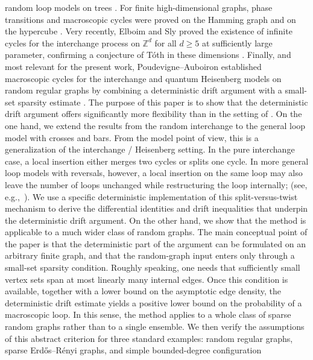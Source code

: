 \documentclass[11pt]{article}
\theoremstyle{remark}
\theoremstyle{plain}
\newcommand{\1}{\mathbbm{1}}
\begin{document}
random loop models on trees \cite{Hammond2015,BetzEhlertLeesRoth2021}. For finite
high-dimensional graphs, phase transitions and macroscopic cycles were proved on the Hamming
graph and on the hypercube
\cite{MilosSengul2019,AdamczakKotowskiMilos2021,KoteckyMilosUeltschi2016}. Very recently,
Elboim and Sly proved the existence of infinite cycles for the interchange process on
\(\mathbb Z^d\) for all \(d\ge 5\) at sufficiently large parameter, confirming a conjecture of
T\'oth in these dimensions \cite{ElboimSly2024}. Finally, and most relevant for the present
work, Poudevigne--Auboiron established macroscopic cycles for the interchange and quantum
Heisenberg models on random regular graphs by combining a deterministic drift argument with a
small-set sparsity estimate \cite{PoudevigneAuboiron2022}.
The purpose of this paper is to show that the deterministic drift argument offers significantly more flexibility than in the setting of \cite{PoudevigneAuboiron2022}. On the one hand, we extend the results from the random interchange to the general loop model with crosses and bars. From the model point of view, this is a generalization of
the interchange / Heisenberg setting. In the pure interchange case, a local insertion either
merges two cycles or splits one cycle. In more general loop models with reversals, however, a
local insertion on the same loop may also leave the number of loops unchanged while
restructuring the loop internally; (see, e.g.,~\cite{BjornbergKotowskiLeesMilos2019}).
We use a specific deterministic implementation of this split-versus-twist mechanism to derive the differential identities and drift inequalities that underpin the deterministic drift argument.
On the other hand, we show that the method is applicable to a much wider class of random graphs. The main
conceptual point of the paper is that the deterministic part of the argument can be formulated
on an arbitrary finite graph, and that the random-graph input enters only through a small-set
sparsity condition. Roughly speaking, one needs that sufficiently small vertex sets span at most
linearly many internal edges. Once this condition is available, together with a lower bound on
the asymptotic edge density, the deterministic drift estimate yields a positive lower bound on
the probability of a macroscopic loop. In this sense, the method applies to a whole class of
sparse random graphs rather than to a single ensemble.
We then verify the assumptions of this abstract criterion for three standard examples: random
regular graphs, sparse Erd\H{o}s--R\'enyi graphs, and simple bounded-degree configuration
\end{document}

